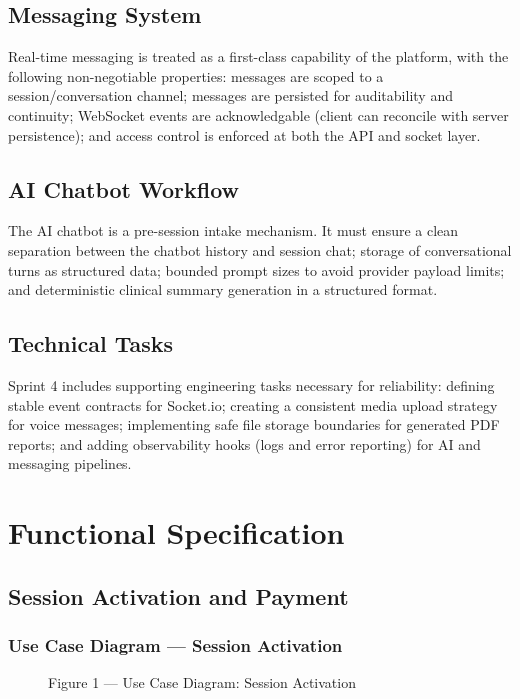 \documentclass[12pt]{article}
\begin{document}
\subsection{Messaging System}
Real-time messaging is treated as a first-class capability of the platform, with the following non-negotiable properties: messages are scoped to a session/conversation channel; messages are persisted for auditability and continuity; WebSocket events are acknowledgable (client can reconcile with server persistence); and access control is enforced at both the API and socket layer.

\subsection{AI Chatbot Workflow}
The AI chatbot is a pre-session intake mechanism. It must ensure a clean separation between the chatbot history and session chat; storage of conversational turns as structured data; bounded prompt sizes to avoid provider payload limits; and deterministic clinical summary generation in a structured format.

\subsection{Technical Tasks}
Sprint 4 includes supporting engineering tasks necessary for reliability: defining stable event contracts for Socket.io; creating a consistent media upload strategy for voice messages; implementing safe file storage boundaries for generated PDF reports; and adding observability hooks (logs and error reporting) for AI and messaging pipelines.

\section{Functional Specification}

\subsection{Session Activation and Payment}
\subsubsection*{Use Case Diagram --- Session Activation}
\begin{figure}[h]
  \centering
  \caption{Figure 1 --- Use Case Diagram: Session Activation}
\end{figure}
\end{document}
